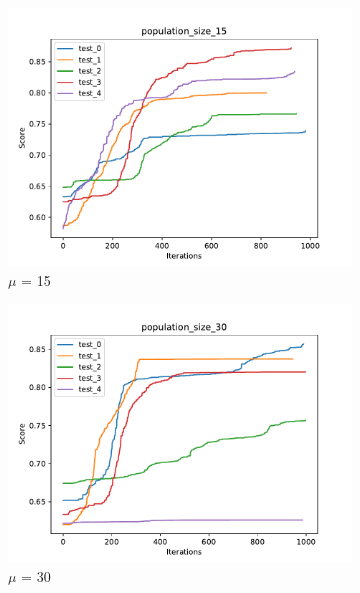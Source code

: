 \begin{figure}[H]
\begin{subfigure}[b]{0.49\linewidth}
        \includegraphics[width=\linewidth]{img/population_size_15.pdf}
        \caption{$\mu$ = 15}
    \end{subfigure}
    \begin{subfigure}[b]{0.49\linewidth}
        \includegraphics[width=\linewidth]{img/population_size_30.pdf}
        \caption{$\mu$ = 30}
    \end{subfigure}
    \begin{subfigure}[b]{0.49\linewidth}

\end{subfigure}
\end{figure}
